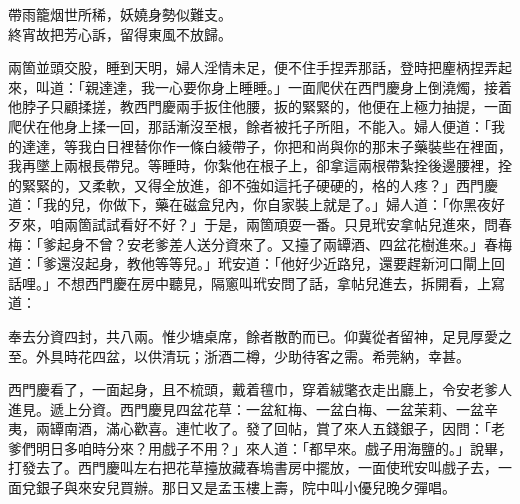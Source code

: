 \begin{myquote}
帶雨籠烟世所稀，妖嬈身勢似難支。\\終宵故把芳心訴，留得東風不放歸。
\end{myquote}

兩箇並頭交股，睡到天明，婦人淫情未足，便不住手捏弄那話，登時把麈柄捏弄起來，叫道：「親達達，我一心要你身上睡睡。」一面爬伏在西門慶身上倒澆燭，接着他脖子只顧揉搓，教西門慶兩手扳住他腰，扳的緊緊的，他便在上極力抽提，一面爬伏在他身上揉一回，那話漸沒至根，餘者被托子所阻，不能入。婦人便道：「我的達達，等我白日裡替你作一條白綾帶子，你把和尚與你的那末子藥裝些在裡面，我再墜上兩根長帶兒。等睡時，你紮他在根子上，卻拿這兩根帶紮拴後邊腰裡，拴的緊緊的，又柔軟，又得全放進，卻不強如這托子硬硬的，格的人疼？」{}西門慶道：「我的兒，你做下，藥在磁盒兒內，你自家裝上就是了。」婦人道：「你黑夜好歹來，咱兩箇試試看好不好？」于是，兩箇頑耍一番。只見玳安拿帖兒進來，問春梅：「爹起身不曾？安老爹差人送分資來了。又擡了兩罈酒、四盆花樹進來。」春梅道：「爹還沒起身，教他等等兒。」玳安道：「他好少近路兒，還要趕新河口閘上回話哩。」不想西門慶在房中聽見，隔窻叫玳安問了話，拿帖兒進去，拆開看，上寫道：

\begin{myquote}[\markfont]
奉去分資四封，共八兩。惟少塘桌席，餘者散酌而已。仰冀從者留神，足見厚愛之至。外具時花四盆，以供清玩；浙酒二樽，少助待客之需。希莞納，幸甚。
\end{myquote}

西門慶看了，一面起身，且不梳頭，戴着氊巾，穿着絨氅衣走出廳上，令安老爹人進見。遞上分資。西門慶見四盆花草：一盆紅梅、一盆白梅、一盆茉莉、一盆辛夷，兩罈南酒，滿心歡喜。連忙收了。發了回帖，賞了來人五錢銀子，因問：「老爹們明日多咱時分來？用戲子不用？」來人道：「都早來。戲子用海鹽的。」說畢，打發去了。西門慶叫左右把花草擡放藏春塢書房中擺放，一面使玳安叫戲子去，一面兌銀子與來安兒買辦。那日又是孟玉樓上壽，院中叫小優兒晚夕彈唱。

